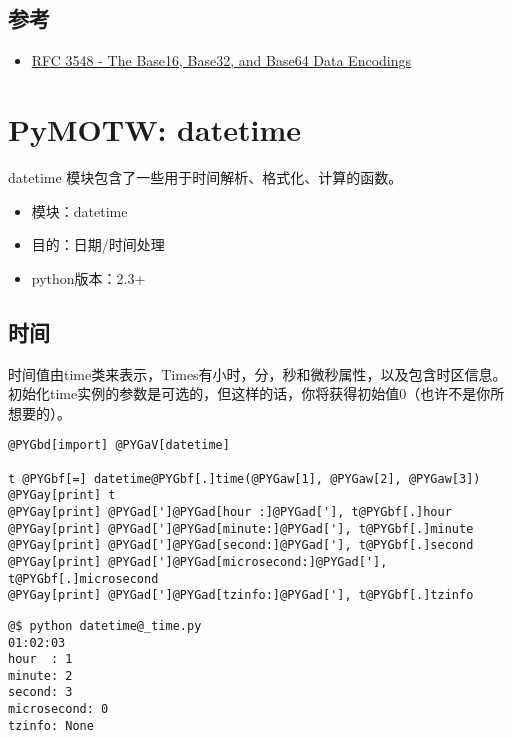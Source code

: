 \documentclass[letterpaper,10pt,english]{manual}
\begin{document}
\subsection{参考}
\begin{itemize}
\item {} 
\href{http://www.faqs.org/rfcs/rfc3548.html}{RFC 3548 - The Base16, Base32, and Base64 Data Encodings}

\end{itemize}

\resetcurrentobjects


\clearpage\section{PyMOTW: datetime}

datetime 模块包含了一些用于时间解析、格式化、计算的函数。
\begin{itemize}
\item {} 
模块：datetime

\item {} 
目的：日期/时间处理

\item {} 
python版本：2.3+

\end{itemize}


\subsection{时间}

时间值由time类来表示，Times有小时，分，秒和微秒属性，以及包含时区信息。初始化time实例的参数是可选的，但这样的话，你将获得初始值0（也许不是你所想要的）。

\begin{Verbatim}[commandchars=@\[\]]
@PYGbd[import] @PYGaV[datetime]

t @PYGbf[=] datetime@PYGbf[.]time(@PYGaw[1], @PYGaw[2], @PYGaw[3])
@PYGay[print] t
@PYGay[print] @PYGad[']@PYGad[hour :]@PYGad['], t@PYGbf[.]hour
@PYGay[print] @PYGad[']@PYGad[minute:]@PYGad['], t@PYGbf[.]minute
@PYGay[print] @PYGad[']@PYGad[second:]@PYGad['], t@PYGbf[.]second
@PYGay[print] @PYGad[']@PYGad[microsecond:]@PYGad['], t@PYGbf[.]microsecond
@PYGay[print] @PYGad[']@PYGad[tzinfo:]@PYGad['], t@PYGbf[.]tzinfo
\end{Verbatim}

\begin{Verbatim}[commandchars=@\[\]]
@$ python datetime@_time.py
01:02:03
hour  : 1
minute: 2
second: 3
microsecond: 0
tzinfo: None
\end{Verbatim}
\end{document}
